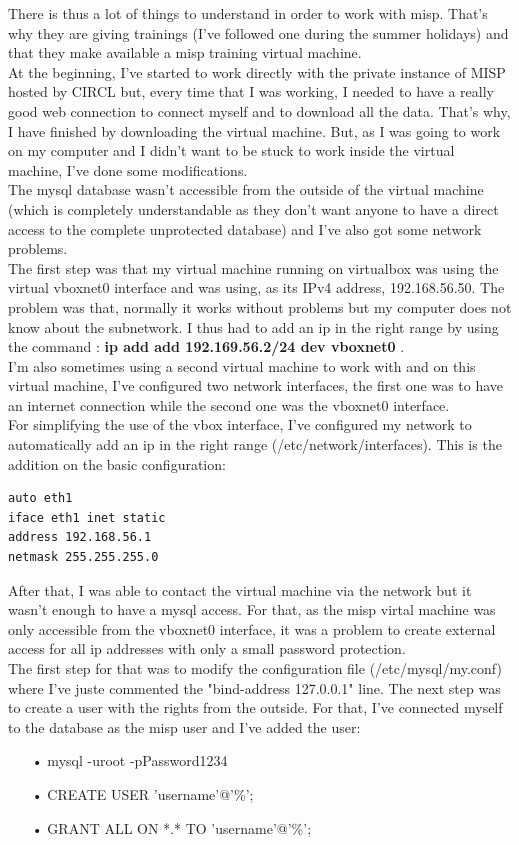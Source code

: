 \documentclass{eplmastersthesis}
\begin{document}
There is thus a lot of things to understand in order to work with misp. That's why they are giving trainings (I've followed one during the summer holidays) and that they make available a misp training virtual machine.\\
At the beginning, I've started to work directly with the private instance of MISP hosted by CIRCL but, every time that I was working, I needed to have a really good web connection to connect myself and to download all the data. That's why, I have finished by downloading the virtual machine. But, as I was going to work on my computer and I didn't want to be stuck to work inside the virtual machine, I've done some modifications.\\
The mysql database wasn't accessible from the outside of the virtual machine (which is completely understandable as they don't want anyone to have a direct access to the complete unprotected database) and I've also got some network problems.\\
The first step was that my virtual machine running on virtualbox was using the virtual vboxnet0 interface and was using, as its IPv4 address, 192.168.56.50. The problem was that, normally it works without problems but my computer does not know about the subnetwork. I thus had to add an ip in the right range by using the command :
\textbf{ip add add 192.169.56.2/24 dev vboxnet0} .\\
I'm also sometimes using a second virtual machine to work with and on this virtual machine, I've configured two network interfaces, the first one was to have an internet connection while the second one was the vboxnet0 interface.\\
For simplifying the use of the vbox interface, I've configured my network to automatically add an ip in the right range (/etc/network/interfaces). This is the addition on the basic configuration:
\begin{verbatim}
auto eth1
iface eth1 inet static
address 192.168.56.1
netmask 255.255.255.0
\end{verbatim}
 
After that, I was able to contact the virtual machine via the network but it wasn't enough to have a mysql access. For that, as the misp virtal machine was only accessible from the vboxnet0 interface, it was a problem to create external access for all ip addresses with only a small password protection.\\
The first step for that was to modify the configuration file (/etc/mysql/my.conf) where I've juste commented the "bind-address 127.0.0.1" line.
The next step was to create a user with the rights from the outside. For that, I've connected myself to the database as the misp user and I've added the user:
\begin{itemize}
\item[•] mysql -uroot -pPassword1234 
\item[•] CREATE USER 'username'@'\%';
\item[•] GRANT ALL ON *.* TO 'username'@'\%';
\end{itemize}
\end{document}
